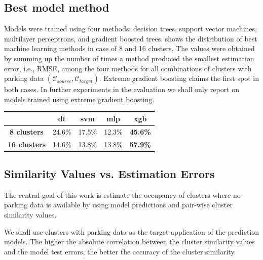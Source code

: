 \documentclass{ws-ijait}
\begin{document}
	\subsection{Best model method}
	Models were trained using four methods: decision trees, support vector machines, multilayer perceptrons, and gradient boosted trees.  shows the distribution of best machine learning methods in case of 8 and 16 clusters.
	The values were obtained by summing up the number of times a method produced the smallest estimation error, i.e., RMSE, among the four methods for all combinations of clusters with parking data $(\mathcal{C}_{source}, \mathcal{C}_{target})$.
	Extreme gradient boosting claims the first spot in both cases.
	In further experiments in the evaluation we shall only report on models trained using extreme gradient boosting.
	
	\begin{table}[!ht]
		{\begin{tabular}{ | c | c | c | c | c |}
				\hline
				& \textbf{dt} & \textbf{svm} & \textbf{mlp} & \textbf{xgb} \\ \hline
				\textbf{8 clusters} & 24.6\% & 17.5\% & 12.3\% & \textbf{45.6\%} \\ \hline
				\textbf{16 clusters} & 14.6\% & 13.8\% & 13.8\% & \textbf{57.9\%} \\ \hline
			\end{tabular}}
			\label{evaluation:best_model_method}
	\end{table}
		
	\subsection{Similarity Values vs. Estimation Errors}
	The central goal of this work is estimate the occupancy of clusters where no parking data is available by using model predictions and pair-wise cluster similarity values. 
	
	
	We shall use clusters with parking data as the target application of the prediction models. 
	The higher the absolute correlation between the cluster similarity values and the model test errors, the better the accuracy of the cluster similarity. 
	
\end{document}
